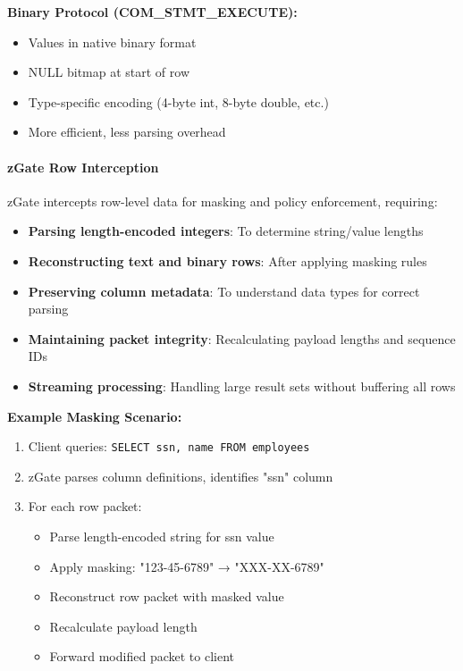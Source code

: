 \textbf{Binary Protocol (COM\_STMT\_EXECUTE):}
\begin{itemize}
    \item Values in native binary format
    \item NULL bitmap at start of row
    \item Type-specific encoding (4-byte int, 8-byte double, etc.)
    \item More efficient, less parsing overhead
\end{itemize}

\paragraph{zGate Row Interception}

zGate intercepts row-level data for masking and policy enforcement, requiring:

\begin{itemize}
    \item \textbf{Parsing length-encoded integers}: To determine string/value lengths
    \item \textbf{Reconstructing text and binary rows}: After applying masking rules
    \item \textbf{Preserving column metadata}: To understand data types for correct parsing
    \item \textbf{Maintaining packet integrity}: Recalculating payload lengths and sequence IDs
    \item \textbf{Streaming processing}: Handling large result sets without buffering all rows
\end{itemize}

\textbf{Example Masking Scenario:}
\begin{enumerate}
    \item Client queries: \texttt{SELECT ssn, name FROM employees}
    \item zGate parses column definitions, identifies "ssn" column
    \item For each row packet:
    \begin{itemize}
        \item Parse length-encoded string for ssn value
        \item Apply masking: "123-45-6789" → "XXX-XX-6789"
        \item Reconstruct row packet with masked value
        \item Recalculate payload length
        \item Forward modified packet to client
    \end{itemize}
\end{enumerate}


